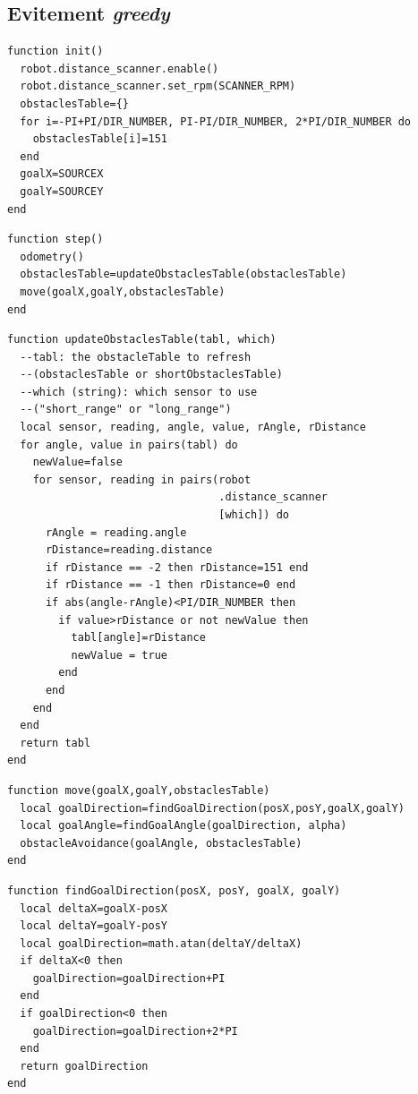 \begin{subappendices}
  \subsection{Evitement \emph{greedy}\label{app:implEvitGreedy}}
  \begin{lstlisting}[caption=Initialisation]
function init()
  robot.distance_scanner.enable()
  robot.distance_scanner.set_rpm(SCANNER_RPM)
  obstaclesTable={}
  for i=-PI+PI/DIR_NUMBER, PI-PI/DIR_NUMBER, 2*PI/DIR_NUMBER do
    obstaclesTable[i]=151
  end
  goalX=SOURCEX
  goalY=SOURCEY
end
  \end{lstlisting}
  \begin{lstlisting}[caption=Structure générale]
function step()
  odometry()
  obstaclesTable=updateObstaclesTable(obstaclesTable)
  move(goalX,goalY,obstaclesTable)
end
  \end{lstlisting}
  \begin{lstlisting}[caption=Rafraîchir la table des mesures à chaque pas, label=lst:updateObstaclesTable]
function updateObstaclesTable(tabl, which)
  --tabl: the obstacleTable to refresh
  --(obstaclesTable or shortObstaclesTable)
  --which (string): which sensor to use
  --("short_range" or "long_range")
  local sensor, reading, angle, value, rAngle, rDistance
  for angle, value in pairs(tabl) do
    newValue=false
    for sensor, reading in pairs(robot
                                 .distance_scanner
                                 [which]) do
      rAngle = reading.angle
      rDistance=reading.distance
      if rDistance == -2 then rDistance=151 end
      if rDistance == -1 then rDistance=0 end
      if abs(angle-rAngle)<PI/DIR_NUMBER then
        if value>rDistance or not newValue then
          tabl[angle]=rDistance
          newValue = true
        end
      end
    end
  end
  return tabl
end
  \end{lstlisting}
  \begin{lstlisting}[caption=Fonction move]
function move(goalX,goalY,obstaclesTable)
  local goalDirection=findGoalDirection(posX,posY,goalX,goalY)
  local goalAngle=findGoalAngle(goalDirection, alpha)
  obstacleAvoidance(goalAngle, obstaclesTable)
end
  \end{lstlisting}
  \begin{lstlisting}[caption=Trouver la direction du goal vu du footbot]
function findGoalDirection(posX, posY, goalX, goalY)
  local deltaX=goalX-posX
  local deltaY=goalY-posY
  local goalDirection=math.atan(deltaY/deltaX)
  if deltaX<0 then
    goalDirection=goalDirection+PI
  end
  if goalDirection<0 then
    goalDirection=goalDirection+2*PI
  end
  return goalDirection
end


\end{lstlisting}
\end{subappendices}
